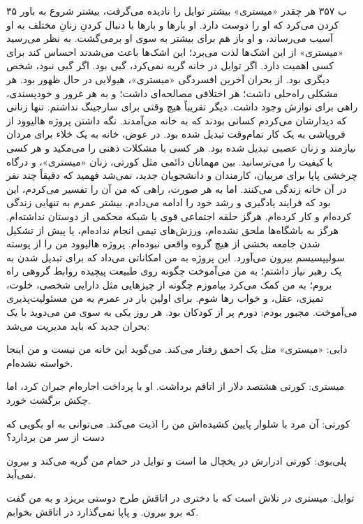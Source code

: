 ۳۵ ب  
۳۵۷  
هر چقدر «میستری» بیشتر توایل را نادیده می‌گرفت، بیشتر شروع به باور کردن می‌کرد که او را دوست دارد. او بارها و بارها با دنبال کردنِ زنانِ مختلف به او آسیب می‌رساند، و او باز هم برای بیشتر به سوی او برمی‌گشت. به نظر می‌رسید «میستری» از این اشک‌ها لذت می‌برد؛ این اشک‌ها باعث می‌شدند احساس کند برای کسی اهمیت دارد. اگر توایل در خانه گریه نمی‌کرد، گبی بود. اگر گبی نبود، شخص دیگری بود. از بحران آخرین افسردگی «میستری»، هیولایی در حال ظهور بود.  
هر مشکلی راه‌حلی داشت؛ هر اختلافی مصالحه‌ای داشت؛ و به هر غرور و خودپسندی، راهی برای نوازش وجود داشت. دیگر تقریباً هیچ وقتی برای سارجینگ نداشتم. تنها زنانی که دیدارشان می‌کردم کسانی بودند که به خانه می‌آمدند. نگه داشتن پروژه هالیوود از فروپاشی به یک کار تمام‌وقت تبدیل شده بود.  
در عوض، خانه به یک خلاء برای مردان نیازمند و زنان عصبی تبدیل شده بود. هر کسی با مشکلات ذهنی را می‌مکید و هر کسی با کیفیت را می‌ترسانید. بین مهمانان دائمی مثل کورتی، زنان «میستری»، و درگاه چرخشی پاپا برای مربیان، کارمندان و دانشجویان جدید، نمی‌شد فهمید که دقیقاً چند نفر در آن خانه زندگی می‌کنند.  
اما به هر صورت، راهی که من آن را تفسیر می‌کردم، این بود که فرایند یادگیری و رشد خود را ادامه می‌دادم. بیشتر عمرم به تنهایی زندگی کرده‌ام و کار کرده‌ام. هرگز حلقه اجتماعی قوی یا شبکه محکمی از دوستان نداشته‌ام. هرگز به باشگاه‌ها ملحق نشده‌ام، ورزش‌های تیمی انجام نداده‌ام، یا پیش از تشکیل شدن جامعه بخشی از هیچ گروه واقعی نبوده‌ام. پروژه هالیوود من را از پوسته سولیپسیسم بیرون می‌آورد. این پروژه به من امکاناتی می‌داد که برای تبدیل شدن به یک رهبر نیاز داشتم؛ به من می‌آموخت چگونه روی طبیعت پیچیده روابط گروهی راه بروم؛ به من کمک می‌کرد بیاموزم چگونه از چیزهایی مثل دارایی شخصی، خلوت، تمیزی، عقل، و خواب رها شوم. برای اولین بار در عمرم به من مسئولیت‌پذیری می‌آموخت. مجبور بودم: دورم پر از کودکان بود. هر روز یکی به سوی من می‌دوید با یک بحران جدید که باید مدیریت می‌شد:

دابی: «میستری» مثل یک احمق رفتار می‌کند. می‌گوید این خانه من نیست و من اینجا خواسته نشده‌ام.

میستری: کورتی هشتصد دلار از اتاقم برداشت. او با پرداخت اجاره‌ام جبران کرد، اما چکش برگشت خورد.

کورتی: آن مرد با شلوار پایین کشیده‌اش من را اذیت می‌کند. می‌توانی به او بگویی که دست از سر من بردارد؟

پلی‌بوی: کورتی ادرارش در یخچال ما است و توایل در حمام من گریه می‌کند و بیرون نمی‌آید.

توایل: میستری در تلاش است که با دختری در اتاقش طرح دوستی بریزد و به من گفت که برو بیرون. و پاپا نمی‌گذارد در اتاقش بخوابم.